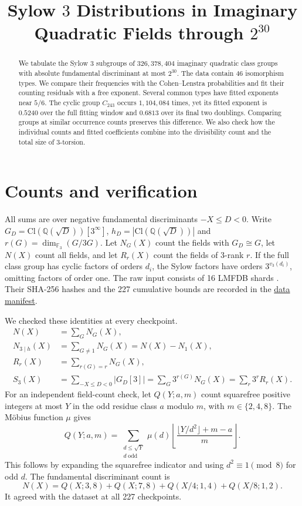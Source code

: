 \documentclass[11pt]{article}
\title{Sylow \(3\) Distributions in Imaginary Quadratic Fields through \(2^{30}\)}
\author{}
\date{}
\newcommand{\Cl}{\mathrm{Cl}}
\newcommand{\Ndiv}{N_{3\mid h}}
\begin{document}
\maketitle

\begin{abstract}
We tabulate the Sylow \(3\) subgroups of \(326{,}378{,}404\) imaginary
quadratic class groups with absolute fundamental discriminant at most \(2^{30}\).
The data contain 46 isomorphism types. We compare their frequencies with the
Cohen--Lenstra probabilities and fit their counting residuals with a free
exponent. Several common types have fitted exponents near \(5/6\).
The cyclic group \(C_{243}\) occurs \(1{,}104{,}084\) times, yet its fitted
exponent is \(0.5240\) over the full fitting window and \(0.6813\) over
its final two doublings. Comparing groups at similar occurrence counts
preserves this difference. We also check how the individual counts and fitted
coefficients combine into the divisibility count and the total size of
\(3\)-torsion.
\end{abstract}

\section{Counts and verification}

All sums are over negative fundamental discriminants \(-X\le D<0\).
Write \(G_D=\Cl(\mathbb Q(\sqrt D))[3^\infty]\), \(h_D=|\Cl(\mathbb Q(\sqrt D))|\)
and \(r(G)=\dim_{\mathbb F_3}(G/3G)\). Let \(N_G(X)\) count the fields with
\(G_D\cong G\), let \(N(X)\) count all fields, and let \(R_r(X)\) count
the fields of \(3\)-rank \(r\). If the full class group has cyclic factors
of orders \(d_i\), the Sylow factors have orders \(3^{v_3(d_i)}\), omitting factors
of order one. The raw input consists of 16 LMFDB shards \cite{lmfdb}. Their SHA-256 hashes
and the 227 cumulative bounds are recorded in the
\href{https://github.com/IsaacLi74/cohen-lenstra-asymptotics/blob/c8b1d72/data/processed/p3_statistics.manifest.json}{data manifest}.

We checked these identities at every checkpoint.
\begin{align}
N(X)&=\sum_G N_G(X),\\
\Ndiv(X)&=\sum_{G\ne 1}N_G(X)=N(X)-N_1(X),\\
R_r(X)&=\sum_{r(G)=r}N_G(X),\\
S_3(X)&=\sum_{-X\le D<0}|G_D[3]|
     =\sum_G 3^{r(G)}N_G(X)=\sum_r3^r R_r(X).
\end{align}
For an independent field-count check, let \(Q(Y;a,m)\) count squarefree
positive integers at most \(Y\) in the odd residue class \(a\) modulo
\(m\), with \(m\in\{2,4,8\}\). The M\"obius function \(\mu\) gives
\[
Q(Y;a,m)=
\sum_{\substack{d\le\sqrt Y\\d\;\mathrm{odd}}}
\mu(d)\left\lfloor\frac{\lfloor Y/d^2\rfloor+m-a}{m}\right\rfloor .
\]
This follows by expanding the squarefree indicator and using
\(d^2\equiv 1\pmod 8\) for odd \(d\). The fundamental discriminant count is
\[
N(X)=Q(X;3,8)+Q(X;7,8)+Q(X/4;1,4)+Q(X/8;1,2).
\]
It agreed with the dataset at all 227 checkpoints.
\end{document}
